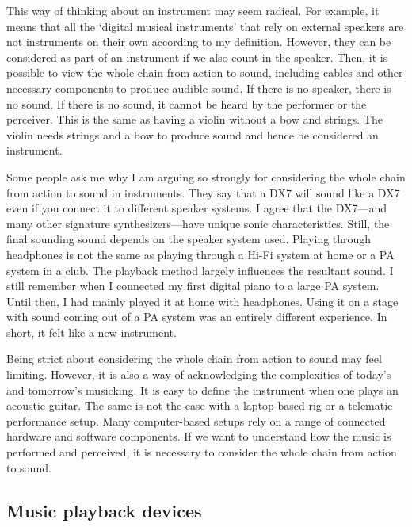 This way of thinking about an instrument may seem radical. For example, it means that all the `digital musical instruments' that rely on external speakers are not instruments on their own according to my definition. However, they can be considered as part of an instrument if we also count in the speaker. Then, it is possible to view the whole chain from action to sound, including cables and other necessary components to produce audible sound. If there is no speaker, there is no sound. If there is no sound, it cannot be heard by the performer or the perceiver. This is the same as having a violin without a bow and strings. The violin needs strings and a bow to produce sound and hence be considered an instrument.

Some people ask me why I am arguing so strongly for considering the whole chain from action to sound in instruments. They say that a DX7 will sound like a DX7 even if you connect it to different speaker systems. I agree that the DX7---and many other signature synthesizers---have unique sonic characteristics. Still, the final sounding sound depends on the speaker system used. Playing through headphones is not the same as playing through a Hi-Fi system at home or a PA system in a club. The playback method largely influences the resultant sound. I still remember when I connected my first digital piano to a large PA system. Until then, I had mainly played it at home with headphones. Using it on a stage with sound coming out of a PA system was an entirely different experience. In short, it felt like a new instrument.

Being strict about considering the whole chain from action to sound may feel limiting. However, it is also a way of acknowledging the complexities of today's and tomorrow's musicking. It is easy to define the instrument when one plays an acoustic guitar. The same is not the case with a laptop-based rig or a telematic performance setup. Many computer-based setups rely on a range of connected hardware and software components. If we want to understand how the music is performed and perceived, it is necessary to consider the whole chain from action to sound.


\subsection{Music playback devices}

